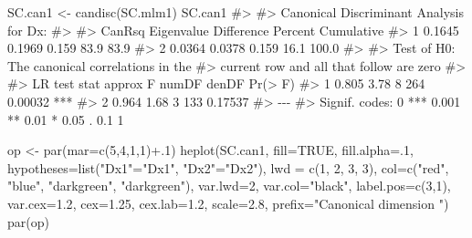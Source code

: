 \documentclass[
  letterpaper,
  10pt,
  krantz2]{krantz}
\makeatletter
\newenvironment{Shaded}{\begin{snugshade}}{\end{snugshade}}
\newcommand{\AttributeTok}[1]{\textcolor[rgb]{0.40,0.45,0.13}{#1}}
\newcommand{\CommentTok}[1]{\textcolor[rgb]{0.37,0.37,0.37}{#1}}
\newcommand{\ConstantTok}[1]{\textcolor[rgb]{0.56,0.35,0.01}{#1}}
\newcommand{\DecValTok}[1]{\textcolor[rgb]{0.68,0.00,0.00}{#1}}
\newcommand{\FloatTok}[1]{\textcolor[rgb]{0.68,0.00,0.00}{#1}}
\newcommand{\FunctionTok}[1]{\textcolor[rgb]{0.28,0.35,0.67}{#1}}
\newcommand{\NormalTok}[1]{\textcolor[rgb]{0.00,0.23,0.31}{#1}}
\newcommand{\OtherTok}[1]{\textcolor[rgb]{0.00,0.23,0.31}{#1}}
\newcommand{\SpecialCharTok}[1]{\textcolor[rgb]{0.37,0.37,0.37}{#1}}
\newcommand{\StringTok}[1]{\textcolor[rgb]{0.13,0.47,0.30}{#1}}
\newenvironment{kframe}{%
  \medskip{}
  \setlength{\fboxsep}{.8em}
  \def\at@end@of@kframe{}%
  \ifinner\ifhmode%
  \def\at@end@of@kframe{\end{minipage}}%
  \begin{minipage}{\columnwidth}%
  \fi\fi%
  \def\FrameCommand##1{\hskip\@totalleftmargin \hskip-\fboxsep
  \colorbox{shadecolor}{##1}\hskip-\fboxsep
      \hskip-\linewidth \hskip-\@totalleftmargin \hskip\columnwidth}%
  \MakeFramed {\advance\hsize-\width
    \@totalleftmargin\z@ \linewidth\hsize
    \@setminipage}}%
{\par\unskip\endMakeFramed%
  \at@end@of@kframe}
\renewenvironment{Shaded}{\begin{kframe}}{\end{kframe}}
\makeatother
\begin{document}
\begin{Shaded}
\begin{Highlighting}[]
\NormalTok{SC.can1 }\OtherTok{\textless{}{-}} \FunctionTok{candisc}\NormalTok{(SC.mlm1)}
\NormalTok{SC.can1}
\CommentTok{\#\textgreater{} }
\CommentTok{\#\textgreater{} Canonical Discriminant Analysis for Dx:}
\CommentTok{\#\textgreater{} }
\CommentTok{\#\textgreater{}   CanRsq Eigenvalue Difference Percent Cumulative}
\CommentTok{\#\textgreater{} 1 0.1645     0.1969      0.159    83.9       83.9}
\CommentTok{\#\textgreater{} 2 0.0364     0.0378      0.159    16.1      100.0}
\CommentTok{\#\textgreater{} }
\CommentTok{\#\textgreater{} Test of H0: The canonical correlations in the }
\CommentTok{\#\textgreater{} current row and all that follow are zero}
\CommentTok{\#\textgreater{} }
\CommentTok{\#\textgreater{}   LR test stat approx F numDF denDF Pr(\textgreater{} F)    }
\CommentTok{\#\textgreater{} 1        0.805     3.78     8   264 0.00032 ***}
\CommentTok{\#\textgreater{} 2        0.964     1.68     3   133 0.17537    }
\CommentTok{\#\textgreater{} {-}{-}{-}}
\CommentTok{\#\textgreater{} Signif. codes:  0 \textquotesingle{}***\textquotesingle{} 0.001 \textquotesingle{}**\textquotesingle{} 0.01 \textquotesingle{}*\textquotesingle{} 0.05 \textquotesingle{}.\textquotesingle{} 0.1 \textquotesingle{} \textquotesingle{} 1}
\end{Highlighting}
\end{Shaded}

\begin{Shaded}
\begin{Highlighting}[]
\NormalTok{op }\OtherTok{\textless{}{-}} \FunctionTok{par}\NormalTok{(}\AttributeTok{mar=}\FunctionTok{c}\NormalTok{(}\DecValTok{5}\NormalTok{,}\DecValTok{4}\NormalTok{,}\DecValTok{1}\NormalTok{,}\DecValTok{1}\NormalTok{)}\SpecialCharTok{+}\NormalTok{.}\DecValTok{1}\NormalTok{)}
\FunctionTok{heplot}\NormalTok{(SC.can1, }
    \AttributeTok{fill=}\ConstantTok{TRUE}\NormalTok{, }\AttributeTok{fill.alpha=}\NormalTok{.}\DecValTok{1}\NormalTok{,}
    \AttributeTok{hypotheses=}\FunctionTok{list}\NormalTok{(}\StringTok{"Dx1"}\OtherTok{=}\StringTok{"Dx1"}\NormalTok{, }\StringTok{"Dx2"}\OtherTok{=}\StringTok{"Dx2"}\NormalTok{),}
    \AttributeTok{lwd =} \FunctionTok{c}\NormalTok{(}\DecValTok{1}\NormalTok{, }\DecValTok{2}\NormalTok{, }\DecValTok{3}\NormalTok{, }\DecValTok{3}\NormalTok{),}
    \AttributeTok{col=}\FunctionTok{c}\NormalTok{(}\StringTok{"red"}\NormalTok{, }\StringTok{"blue"}\NormalTok{, }\StringTok{"darkgreen"}\NormalTok{, }\StringTok{"darkgreen"}\NormalTok{),}
    \AttributeTok{var.lwd=}\DecValTok{2}\NormalTok{, }
    \AttributeTok{var.col=}\StringTok{"black"}\NormalTok{, }
    \AttributeTok{label.pos=}\FunctionTok{c}\NormalTok{(}\DecValTok{3}\NormalTok{,}\DecValTok{1}\NormalTok{), }
    \AttributeTok{var.cex=}\FloatTok{1.2}\NormalTok{, }
    \AttributeTok{cex=}\FloatTok{1.25}\NormalTok{, }\AttributeTok{cex.lab=}\FloatTok{1.2}\NormalTok{, }
    \AttributeTok{scale=}\FloatTok{2.8}\NormalTok{,}
    \AttributeTok{prefix=}\StringTok{"Canonical dimension "}\NormalTok{)}
\FunctionTok{par}\NormalTok{(op)}
\end{Highlighting}
\end{Shaded}
\end{document}
